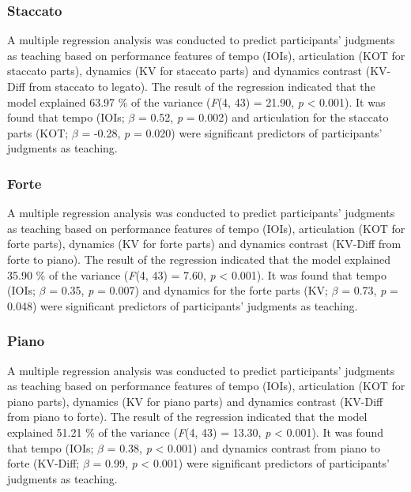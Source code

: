 \documentclass[
  man,floatsintext]{apa6}
\begin{document}
\hypertarget{staccato}{%
\subsubsection{Staccato}\label{staccato}}

A multiple regression analysis was conducted to predict participants' judgments as teaching based on performance features of tempo (IOIs), articulation (KOT for staccato parts), dynamics (KV for staccato parts) and dynamics contrast (KV-Diff from staccato to legato). The result of the regression indicated that the model explained 63.97 \% of the variance (\emph{F}(4, 43) = 21.90, \emph{p} \textless{} 0.001). It was found that tempo (IOIs; \emph{\(\beta\)} = 0.52, \emph{p} = 0.002) and articulation for the staccato parts (KOT; \emph{\(\beta\)} = -0.28, \emph{p} = 0.020) were significant predictors of participants' judgments as teaching.

\hypertarget{forte}{%
\subsubsection{Forte}\label{forte}}

A multiple regression analysis was conducted to predict participants' judgments as teaching based on performance features of tempo (IOIs), articulation (KOT for forte parts), dynamics (KV for forte parts) and dynamics contrast (KV-Diff from forte to piano). The result of the regression indicated that the model explained 35.90 \% of the variance (\emph{F}(4, 43) = 7.60, \emph{p} \textless{} 0.001). It was found that tempo (IOIs; \emph{\(\beta\)} = 0.35, \emph{p} = 0.007) and dynamics for the forte parts (KV; \emph{\(\beta\)} = 0.73, \emph{p} = 0.048) were significant predictors of participants' judgments as teaching.

\hypertarget{piano}{%
\subsubsection{Piano}\label{piano}}

A multiple regression analysis was conducted to predict participants' judgments as teaching based on performance features of tempo (IOIs), articulation (KOT for piano parts), dynamics (KV for piano parts) and dynamics contrast (KV-Diff from piano to forte). The result of the regression indicated that the model explained 51.21 \% of the variance (\emph{F}(4, 43) = 13.30, \emph{p} \textless{} 0.001). It was found that tempo (IOIs; \emph{\(\beta\)} = 0.38, \emph{p} \textless{} 0.001) and dynamics contrast from piano to forte (KV-Diff; \emph{\(\beta\)} = 0.99, \emph{p} \textless{} 0.001) were significant predictors of participants' judgments as teaching.
\end{document}
